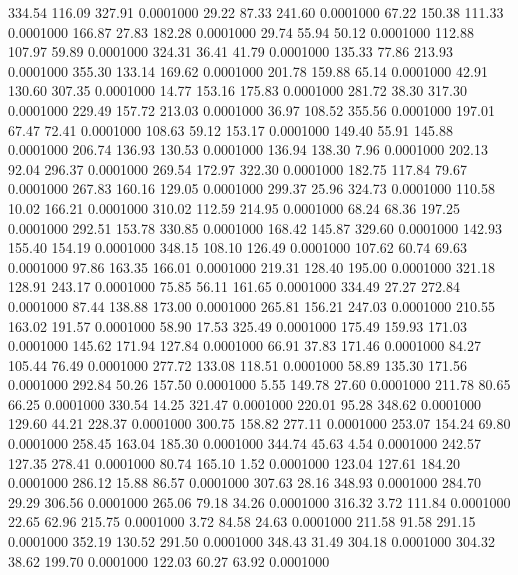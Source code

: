  334.54  116.09  327.91   0.0001000
  29.22   87.33  241.60   0.0001000
  67.22  150.38  111.33   0.0001000
 166.87   27.83  182.28   0.0001000
  29.74   55.94   50.12   0.0001000
 112.88  107.97   59.89   0.0001000
 324.31   36.41   41.79   0.0001000
 135.33   77.86  213.93   0.0001000
 355.30  133.14  169.62   0.0001000
 201.78  159.88   65.14   0.0001000
  42.91  130.60  307.35   0.0001000
  14.77  153.16  175.83   0.0001000
 281.72   38.30  317.30   0.0001000
 229.49  157.72  213.03   0.0001000
  36.97  108.52  355.56   0.0001000
 197.01   67.47   72.41   0.0001000
 108.63   59.12  153.17   0.0001000
 149.40   55.91  145.88   0.0001000
 206.74  136.93  130.53   0.0001000
 136.94  138.30    7.96   0.0001000
 202.13   92.04  296.37   0.0001000
 269.54  172.97  322.30   0.0001000
 182.75  117.84   79.67   0.0001000
 267.83  160.16  129.05   0.0001000
 299.37   25.96  324.73   0.0001000
 110.58   10.02  166.21   0.0001000
 310.02  112.59  214.95   0.0001000
  68.24   68.36  197.25   0.0001000
 292.51  153.78  330.85   0.0001000
 168.42  145.87  329.60   0.0001000
 142.93  155.40  154.19   0.0001000
 348.15  108.10  126.49   0.0001000
 107.62   60.74   69.63   0.0001000
  97.86  163.35  166.01   0.0001000
 219.31  128.40  195.00   0.0001000
 321.18  128.91  243.17   0.0001000
  75.85   56.11  161.65   0.0001000
 334.49   27.27  272.84   0.0001000
  87.44  138.88  173.00   0.0001000
 265.81  156.21  247.03   0.0001000
 210.55  163.02  191.57   0.0001000
  58.90   17.53  325.49   0.0001000
 175.49  159.93  171.03   0.0001000
 145.62  171.94  127.84   0.0001000
  66.91   37.83  171.46   0.0001000
  84.27  105.44   76.49   0.0001000
 277.72  133.08  118.51   0.0001000
  58.89  135.30  171.56   0.0001000
 292.84   50.26  157.50   0.0001000
   5.55  149.78   27.60   0.0001000
 211.78   80.65   66.25   0.0001000
 330.54   14.25  321.47   0.0001000
 220.01   95.28  348.62   0.0001000
 129.60   44.21  228.37   0.0001000
 300.75  158.82  277.11   0.0001000
 253.07  154.24   69.80   0.0001000
 258.45  163.04  185.30   0.0001000
 344.74   45.63    4.54   0.0001000
 242.57  127.35  278.41   0.0001000
  80.74  165.10    1.52   0.0001000
 123.04  127.61  184.20   0.0001000
 286.12   15.88   86.57   0.0001000
 307.63   28.16  348.93   0.0001000
 284.70   29.29  306.56   0.0001000
 265.06   79.18   34.26   0.0001000
 316.32    3.72  111.84   0.0001000
  22.65   62.96  215.75   0.0001000
   3.72   84.58   24.63   0.0001000
 211.58   91.58  291.15   0.0001000
 352.19  130.52  291.50   0.0001000
 348.43   31.49  304.18   0.0001000
 304.32   38.62  199.70   0.0001000
 122.03   60.27   63.92   0.0001000
